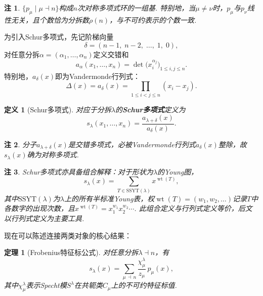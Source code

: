 \documentclass{sjtureport}
\newtheorem{theorem}{定理}[chapter]
\newtheorem{definition}{定义}[chapter]
\newtheorem{remark}{注}[chapter]
\begin{document}
\begin{remark}
    $\{p_\mu \mid \mu \dashv n\}$构成$n$次对称多项式环的一组基. 特别地，当$\mu \neq \nu$时，$p_\mu$与$p_\nu$线性无关，且个数恰为分拆数$\rho(n)$，与不可约表示的个数一致. 
\end{remark}


为引入Schur多项式，先记阶梯向量
\begin{equation*}
    \delta = (n-1,\;n-2,\;\dots,\;1,\;0),
\end{equation*}
对任意分拆$\alpha=(\alpha_1,\dots,\alpha_n)$定义交错和
\begin{equation*}
    a_\alpha(x_1,\dots,x_n) = \det\bigl(x_i^{\alpha_j}\bigr)_{1 \le i,j \le n}.
\end{equation*}
特别地，$a_\delta(x)$即为Vandermonde行列式：
\begin{equation*}
    \Delta(x) = a_\delta(x) = \prod_{1 \le i < j \le n} (x_i - x_j).
\end{equation*}

\begin{definition}[Schur多项式]
    对应于分拆$\lambda$的\textbf{Schur多项式}定义为
    \begin{equation*}
        s_\lambda(x_1,\dots,x_n) = \frac{a_{\lambda+\delta}(x)}{a_\delta(x)}.
    \end{equation*}
\end{definition}

\begin{remark}
    分子$a_{\lambda+\delta}(x)$是交错多项式，必被Vandermonde行列式$a_\delta(x)$整除，故$s_\lambda(x)$确为对称多项式. 
\end{remark}

\begin{remark}
    Schur多项式亦具备组合解释：对于形状为$\lambda$的Young图，
    \begin{equation*}
        s_\lambda(x) = \sum_{T \in \mathrm{SSYT}(\lambda)} x^{\operatorname{wt}(T)},
    \end{equation*}
    其中$\mathrm{SSYT}(\lambda)$为$\lambda$上的所有半标准Young表，权$\operatorname{wt}(T)=(w_1,w_2,\dots)$记录$T$中各数字的出现次数，且$x^{\operatorname{wt}(T)} = x_1^{w_1}x_2^{w_2}\cdots$. 此组合定义与行列式定义等价，后文以行列式定义为主要工具. 
\end{remark}


现在可以陈述连接两类对象的核心结果：

\begin{theorem}[Frobenius特征标公式]\label{thm:frobenius}
    对任意分拆$\lambda \dashv n$，有
    \begin{equation}\label{eq:frobenius}
        s_\lambda(x) = \sum_{\mu \,\dashv\, n} \frac{\chi^\lambda_\mu}{z_\mu}\, p_\mu(x),
    \end{equation}
    其中$\chi^\lambda_\mu$表示Specht模$S^\lambda$在共轭类$C_\mu$上的不可约特征标值. 
\end{theorem}
\end{document}
